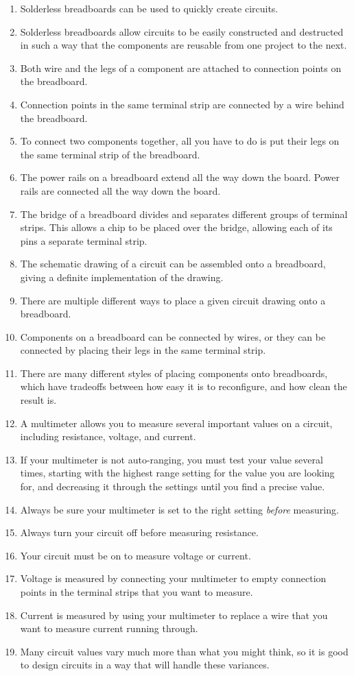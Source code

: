 \begin{enumerate}
\item Solderless breadboards can be used to quickly create circuits.
\item Solderless breadboards allow circuits to be easily constructed and destructed in such a way that the components are reusable from one project to the next.
\item Both wire and the legs of a component are attached to connection points on the breadboard.
\item Connection points in the same terminal strip are connected by a wire behind the breadboard.
\item To connect two components together, all you have to do is put their legs on the same terminal strip of the breadboard.
\item The power rails on a breadboard extend all the way down the board.  Power rails are connected all the way down the board.
\item The bridge of a breadboard divides and separates different groups of terminal strips.  This allows a chip to be placed over the bridge, allowing each of its pins a separate terminal strip.
\item The schematic drawing of a circuit can be assembled onto a breadboard, giving a definite implementation of the drawing.
\item There are multiple different ways to place a given circuit drawing onto a breadboard.
\item Components on a breadboard can be connected by wires, or they can be connected by placing their legs in the same terminal strip.
\item There are many different styles of placing components onto breadboards, which have tradeoffs between how easy it is to reconfigure, and how clean the result is.
\item A multimeter allows you to measure several important values on a circuit, including resistance, voltage, and current.
\item If your multimeter is not auto-ranging, you must test your value several times, starting with the highest range setting for the value you are looking for, and decreasing it through the settings until you find a precise value.
\item Always be sure your multimeter is set to the right setting \emph{before} measuring.
\item Always turn your circuit off before measuring resistance.
\item Your circuit must be on to measure voltage or current.
\item Voltage is measured by connecting your multimeter to empty connection points in the terminal strips that you want to measure.
\item Current is measured by using your multimeter to replace a wire that you want to measure current running through.
\item Many circuit values vary much more than what you might think, so it is good to design circuits in a way that will handle these variances.
\end{enumerate}

